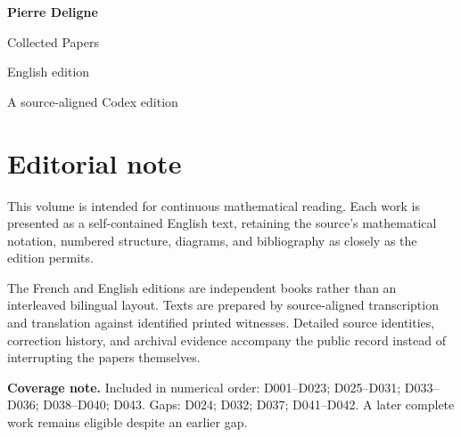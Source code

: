 \documentclass[11pt,a4paper]{article}
\begin{document}
\begin{titlepage}
  \pagecolor{DeligneBlue}
  \color{white}
  \vspace*{34mm}
  {\fontsize{30}{36}\selectfont\bfseries Pierre Deligne\par}
  \vspace{7mm}
  {\fontsize{18}{23}\selectfont Collected Papers\par}
  \vspace{4mm}
  {\large English edition\par}
  \vfill
  {\normalsize A source-aligned Codex edition\par}
\end{titlepage}
\setcounter{page}{2}
\nopagecolor
\color{DeligneInk}
\section*{Editorial note}
This volume is intended for continuous mathematical reading. Each work is presented as a self-contained English text, retaining the source's mathematical notation, numbered structure, diagrams, and bibliography as closely as the edition permits.

The French and English editions are independent books rather than an interleaved bilingual layout. Texts are prepared by source-aligned transcription and translation against identified printed witnesses. Detailed source identities, correction history, and archival evidence accompany the public record instead of interrupting the papers themselves.

\textbf{Coverage note.} Included in numerical order: D001--D023; D025--D031; D033--D036; D038--D040; D043. Gaps: D024; D032; D037; D041--D042. A later complete work remains eligible despite an earlier gap.
\end{document}

